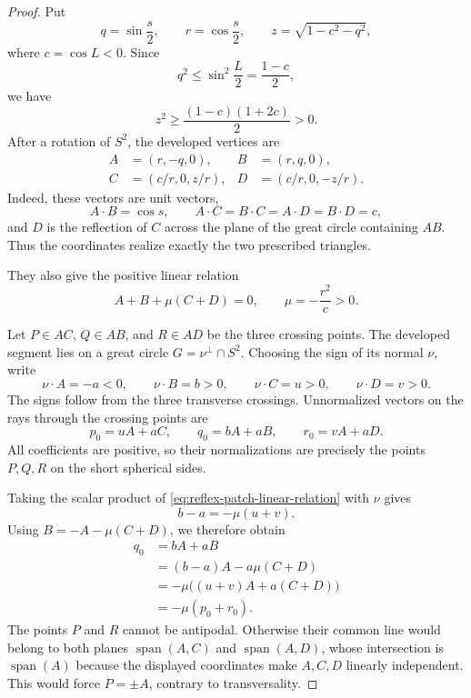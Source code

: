 \documentclass[10pt,a4paper]{amsart}
\begin{document}
\begin{proof}
Put
\[
 q=\sin\frac{s}{2},\qquad r=\cos\frac{s}{2},\qquad
 z=\sqrt{1-c^2-q^2},
\]
where \(c=\cos L<0\).  Since
\[
 q^2\le\sin^2\frac L2=\frac{1-c}{2},
\]
we have
\[
 z^2\ge\frac{(1-c)(1+2c)}2>0.
\]
After a rotation of \(S^2\), the developed vertices are
\[
 \begin{aligned}
 A&=(r,-q,0),& B&=(r,q,0),\\
 C&=(c/r,0,z/r),&D&=(c/r,0,-z/r).
 \end{aligned}
\]
Indeed, these vectors are unit vectors,
\[
 A\cdot B=\cos s,
 \qquad
 A\cdot C=B\cdot C=A\cdot D=B\cdot D=c,
\]
and \(D\) is the reflection of \(C\) across the plane of the great circle
containing \(AB\).  Thus the coordinates realize exactly the two prescribed
triangles.

They also give the positive linear relation
\begin{equation}\label{eq:reflex-patch-linear-relation}
        A+B+\mu(C+D)=0,
        \qquad
        \mu=-\frac{r^2}{c}>0 .
\end{equation}

Let \(P\in AC\), \(Q\in AB\), and \(R\in AD\) be the three crossing points.
The developed segment lies on a great circle
\(G=\nu^\perp\cap S^2\).  Choosing the sign of its normal \(\nu\), write
\[
 \nu\cdot A=-a<0,\qquad
 \nu\cdot B=b>0,\qquad
 \nu\cdot C=u>0,\qquad
 \nu\cdot D=v>0.
\]
The signs follow from the three transverse crossings.  Unnormalized vectors
on the rays through the crossing points are
\[
 p_0=uA+aC,\qquad
 q_0=bA+aB,\qquad
 r_0=vA+aD.
\]
All coefficients are positive, so their normalizations are precisely the
points \(P,Q,R\) on the short spherical sides.

Taking the scalar product of
\eqref{eq:reflex-patch-linear-relation} with \(\nu\) gives
\[
        b-a=-\mu(u+v).
\]
Using \(B=-A-\mu(C+D)\), we therefore obtain
\[
 \begin{aligned}
 q_0
 &=bA+aB\\
 &=(b-a)A-a\mu(C+D)\\
 &=-\mu\bigl((u+v)A+a(C+D)\bigr)\\
 &=-\mu(p_0+r_0).
 \end{aligned}
\]
The points \(P\) and \(R\) cannot be antipodal.  Otherwise their common line
would belong to both planes \(\operatorname{span}(A,C)\) and
\(\operatorname{span}(A,D)\), whose intersection is
\(\operatorname{span}(A)\) because the displayed coordinates make
\(A,C,D\) linearly independent.  This would force \(P=\pm A\), contrary to
transversality.


\end{proof}
\end{document}
